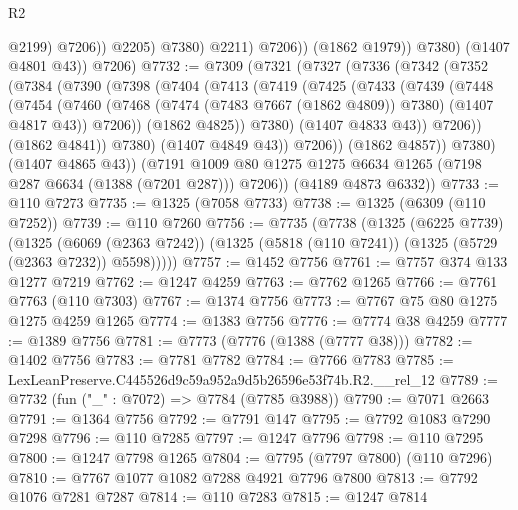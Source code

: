 \begin{lexlean}{R2}
\begin{coremodule}
                            @2199)
                          @7206))
                      @2205)
                    @7380)
                  @2211)
                @7206))
            (@1862 @1979))
          @7380)
        (@1407 @4801 @43))
      @7206)
@7732 := @7309
    (@7321
      (@7327
        (@7336
          (@7342
            (@7352
              (@7384
                (@7390
                  (@7398
                    (@7404
                      (@7413
                        (@7419
                          (@7425
                            (@7433
                              (@7439
                                (@7448
                                  (@7454
                                    (@7460
                                      (@7468
                                        (@7474 (@7483 @7667 (@1862 @4809)) @7380)
                                        (@1407 @4817 @43))
                                      @7206))
                                  (@1862 @4825))
                                @7380)
                              (@1407 @4833 @43))
                            @7206))
                        (@1862 @4841))
                      @7380)
                    (@1407 @4849 @43))
                  @7206))
              (@1862 @4857))
            @7380)
          (@1407 @4865 @43))
        (@7191 @1009 @80 @1275 @1275 @6634 @1265 (@7198 @287 @6634 (@1388 (@7201 @287))) @7206))
      (@4189 @4873 @6332))
@7733 := @110 @7273
@7735 := @1325 (@7058 @7733)
@7738 := @1325 (@6309 (@110 @7252))
@7739 := @110 @7260
@7756 := @7735
    (@7738
      (@1325
        (@6225 @7739)
        (@1325
          (@6069 (@2363 @7242))
          (@1325 (@5818 (@110 @7241)) (@1325 (@5729 (@2363 @7232)) @5598)))))
@7757 := @1452 @7756
@7761 := @7757 @374 @133 @1277 @7219
@7762 := @1247 @4259
@7763 := @7762 @1265
@7766 := @7761 @7763 (@110 @7303)
@7767 := @1374 @7756
@7773 := @7767 @75 @80 @1275 @1275 @4259 @1265
@7774 := @1383 @7756
@7776 := @7774 @38 @4259
@7777 := @1389 @7756
@7781 := @7773 (@7776 (@1388 (@7777 @38)))
@7782 := @1402 @7756
@7783 := @7781 @7782
@7784 := @7766 @7783
@7785 := LexLeanPreserve.C445526d9c59a952a9d5b26596e53f74b.R2.__rel_12
@7789 := @7732 (fun ("_" : @7072) => @7784 (@7785 @3988))
@7790 := @7071 @2663
@7791 := @1364 @7756
@7792 := @7791 @147
@7795 := @7792 @1083 @7290 @7298
@7796 := @110 @7285
@7797 := @1247 @7796
@7798 := @110 @7295
@7800 := @1247 @7798 @1265
@7804 := @7795 (@7797 @7800) (@110 @7296)
@7810 := @7767 @1077 @1082 @7288 @4921 @7796 @7800
@7813 := @7792 @1076 @7281 @7287
@7814 := @110 @7283
@7815 := @1247 @7814

\end{coremodule}
\end{lexlean}
